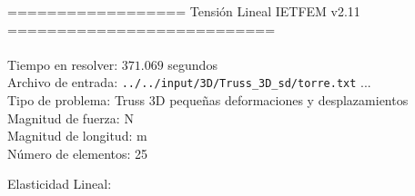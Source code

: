 \documentclass[a4paper,11pt]{article}
\begin{document}

================== Tensión Lineal IETFEM v2.11 ===========================\\\\


Tiempo en resolver: $371.069$ segundos \\

Archivo de entrada: \verb|../../input/3D/Truss_3D_sd/torre.txt|  ... \\

Tipo de problema: Truss 3D pequeñas deformaciones y desplazamientos\\ 

Magnitud de fuerza: N \\

Magnitud de longitud: m \\

Número de elementos: 25 \\

\newpage       

Elasticidad Lineal:\\
\end{document}
